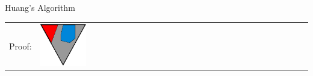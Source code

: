 \documentclass[final,compress]{beamer}
\begin{document}
\newcommand{\fakemulticolwidth}{0.28\textwidth}
	\newcommand{\proofwidth}{0.18\textwidth}
	\newcommand{\proofindent}{\hspace*{11.21em}}

	\newcommand{\stagearrow}{{\Large$\Downarrow$}}

\subsection{}
\begin{frame}{Huang's Algorithm}
	\small
	
	\begin{tabular}{p{}ll}

		Proof: 
		&

		\multicolumn{1}{m{\fakemulticolwidth}}{
			\includegraphics[width=\proofwidth]{figures/two_phase_draft_proof}
		}
		&
		\vspace*{0.2em}
		\\


\end{tabular}
\end{frame}
\end{document}
